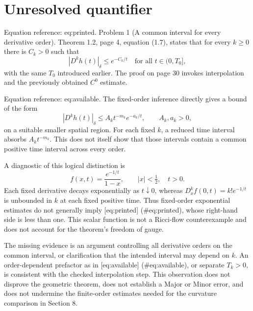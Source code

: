 \documentclass[10pt]{article}
\begin{document}
\section*{Unresolved quantifier}
Equation reference: eq:printed. Problem 1 (A common interval for every derivative order).  Theorem 1.2, page 4, equation (1.7), states that for every \(k\geq0\) there is \(C_k>0\) such that \[
 |D^kh(t)|_\delta\leq e^{-C_k/t}
 \quad\text{for all }t\in(0,T_0],\] with the same \(T_0\) introduced earlier. The proof on page 30 invokes interpolation and the previously obtained \(C^0\) estimate.\par
Equation reference: eq:available. The fixed-order inference directly gives a bound of the form \[
 |D^kh(t)|_\delta\leq A_k t^{-m_k}e^{-a_k/t},
 \qquad A_k,a_k>0,\] on a suitable smaller spatial region. For each fixed \(k\), a reduced time interval absorbs \(A_kt^{-m_k}\). This does not itself show that those intervals contain a common positive time interval across every order.\par
A diagnostic of this logical distinction is \[f(x,t)=\frac{e^{-1/t}}{1-x},\qquad |x|<\tfrac12,\quad t>0.\] Each fixed derivative decays exponentially as \(t\downarrow0\), whereas \(D_x^kf(0,t)=k!e^{-1/t}\) is unbounded in \(k\) at each fixed positive time. Thus fixed-order exponential estimates do not generally imply [eq:printed] (\#eq:printed), whose right-hand side is less than one. This scalar function is not a Ricci-flow counterexample and does not account for the theorem’s freedom of gauge.\par
The missing evidence is an argument controlling all derivative orders on the common interval, or clarification that the intended interval may depend on \(k\). An order-dependent prefactor as in [eq:available] (\#eq:available), or separate \(T_k>0\), is consistent with the checked interpolation step. This observation does not disprove the geometric theorem, does not establish a Major or Minor error, and does not undermine the finite-order estimates needed for the curvature comparison in Section 8.\par
\end{document}
